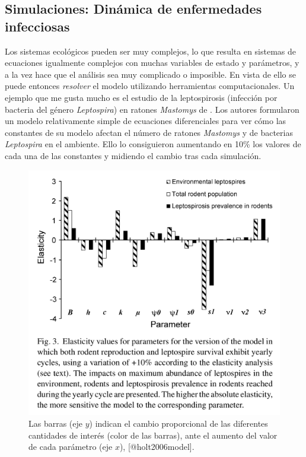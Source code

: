 \documentclass[
]{book}
\begin{document}
\hypertarget{simulaciones-dinuxe1mica-de-enfermedades-infecciosas}{%
\subsection{Simulaciones: Dinámica de enfermedades infecciosas}\label{simulaciones-dinuxe1mica-de-enfermedades-infecciosas}}

Los sistemas ecológicos pueden ser muy complejos, lo que resulta en sistemas de ecuaciones igualmente complejos con muchas variables de estado y parámetros, y a la vez hace que el análisis sea muy complicado o imposible. En vista de ello se puede entonces \emph{resolver} el modelo utilizando herramientas computacionales. Un ejemplo que me gusta mucho es el estudio de la leptospirosis (infección por bacteria del género \emph{Leptospira}) en ratones \emph{Mastomys} de \citet{holt2006model}. Los autores formularon un modelo relativamente simple de ecuaciones diferenciales para ver cómo las constantes de su modelo afectan el número de ratones \emph{Mastomys} y de bacterias \emph{Leptospira} en el ambiente. Ello lo consiguieron aumentando en 10\% los valores de cada una de las constantes y midiendo el cambio tras cada simulación.

\begin{figure}

{\centering \includegraphics[width=22.78in]{Unidad-I/lepto} 

}

\caption{Las barras (eje $y$) indican el cambio proporcional de las diferentes cantidades de interés (color de las barras), ante el aumento del valor de cada parámetro (eje $x$), [@holt2006model].}\label{fig:lepto}
\end{figure}
\end{document}

